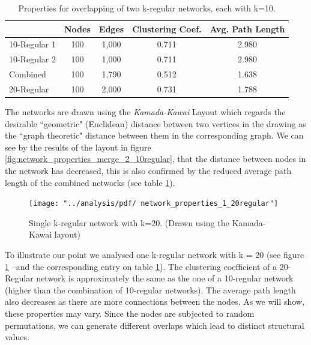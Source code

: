 \documentclass[preprint,number]{elsarticle}
\begin{document}
\begin{table}
	\centering
	\begin{minipage}{0.9\textwidth}
		\caption{Properties for overlapping of two k-regular networks, each with k=10.}
		\label{tab:network_properties_merge_2_10regular}
	\end{minipage}
	\begin{tabular}{lcccc}
		& Nodes &  Edges & Clustering Coef.	  &  Avg. Path Length \\ 
		\hline  10-Regular 1 & 100 &  1,000  &  0.711 &  2.980 \\ 
		\hline  10-Regular 2 & 100 & 1,000 & 0.711 &  2.980 \\ 
		\hline  Combined & 100 & 1,790  & 0.512 &  1.638 \\ 
		\hline 20-Regular & 100 & 2,000	& 0.731	& 1.788 \\
		\hline 
	\end{tabular} 
\end{table}

The networks are drawn using the \textit{Kamada-Kawai} Layout \cite{Kamada19897} which regards the desirable ``geometric" (Euclidean) distance between two vertices in the drawing as the ``graph theoretic" distance between them in the corresponding graph. We can see by the results of the layout in figure \ref{fig:network_properties_merge_2_10regular}, that the distance between nodes in the network has decreased, this is also confirmed by the reduced average path length of the combined networks (see table \ref{tab:network_properties_merge_2_10regular}). 

\begin{figure}
	\texttt{[image: "../analysis/pdf/ network\_properties\_1\_20regular"]}
	\begin{minipage}{0.8\linewidth}
		\caption{Single k-regular network with k=20. (Drawn using the Kamada-Kawai layout)}
		\label{fig:network_properties_1_20regular}
	\end{minipage}
\end{figure}

To illustrate our point we analysed one k-regular network with k = 20 (see figure \ref{fig:network_properties_1_20regular} --and the corresponding entry on table \ref{tab:network_properties_merge_2_10regular}). The clustering coefficient of a 20-Regular network is approximately the same as the one of a 10-regular network (higher than the combination of 10-regular networks). The average path length also decreases as there are more connections between the nodes. As we will show, these properties may vary. Since the nodes are subjected to random permutations, we can generate different overlaps which lead to distinct structural values.
\end{document}
